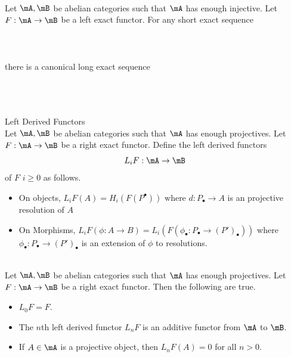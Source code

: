 \documentclass[a4paper]{article}
\begin{document}
\begin{prp}{}{}\\
Let $\mA,\mB$ be abelian categories such that $\mA$ has enough injective. Let $F:\mA\to\mB$ be a left exact functor. For any short exact sequence \\~\\
\\~\\
there is a canonical long exact sequence \\~\\
\\~\\
\end{prp}

\begin{defn}{Left Derived Functors}{}\\
Let $\mA,\mB$ be abelian categories such that $\mA$ has enough projectives. Let $F:\mA\to\mB$ be a right exact functor. Define the left derived functors $$L_iF:\mA\to\mB$$ of $F$ $i\geq 0$ as follows. 
\begin{itemize}
\item On objects, $L_iF(A)=H_i(F(P^\bullet))$ where $d:P_\bullet\to A$ is an projective resolution of $A$
\item On Morphisms, $L_iF(\phi:A\to B)=L_i(F(\phi_\bullet:P_\bullet\to (P')_\bullet))$ where $\phi_\bullet:P_\bullet\to(P')_\bullet$ is an extension of $\phi$ to resolutions. 
\end{itemize}
\end{defn}

\begin{prp}{}{}\\
Let $\mA,\mB$ be abelian categories such that $\mA$ has enough projectives. Let $F:\mA\to\mB$ be a right exact functor. Then the following are true. 
\begin{itemize}
\item $L_0F=F$. 
\item The $n$th left derived functor $L_nF$ is an additive functor from $\mA$ to $\mB$. 
\item If $A\in\mA$ is a projective object, then $L_nF(A)=0$ for all $n>0$. 
\end{itemize}
\end{prp}
\end{document}

